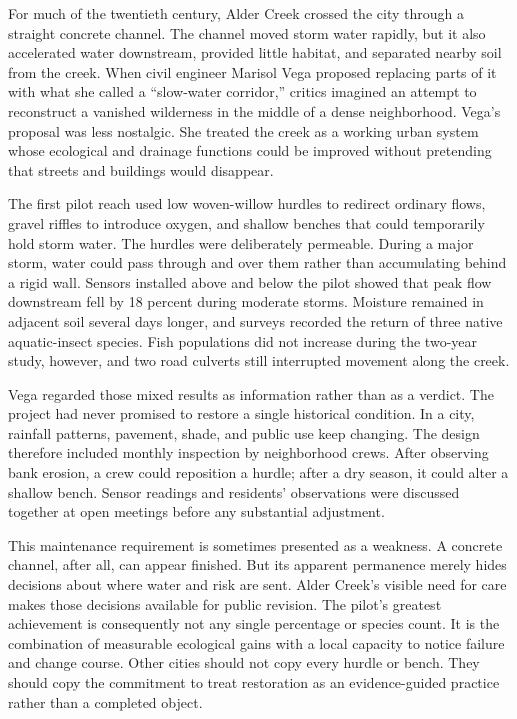 For much of the twentieth century, Alder Creek crossed the city through a straight
concrete channel. The channel moved storm water rapidly, but it also accelerated water
downstream, provided little habitat, and separated nearby soil from the creek. When civil
engineer Marisol Vega proposed replacing parts of it with what she called a ``slow-water
corridor,'' critics imagined an attempt to reconstruct a vanished wilderness in the middle
of a dense neighborhood. Vega's proposal was less nostalgic. She treated the creek as a
working urban system whose ecological and drainage functions could be improved without
pretending that streets and buildings would disappear.

The first pilot reach used low woven-willow hurdles to redirect ordinary flows, gravel
riffles to introduce oxygen, and shallow benches that could temporarily hold storm water.
The hurdles were deliberately permeable. During a major storm, water could pass through
and over them rather than accumulating behind a rigid wall. Sensors installed above and
below the pilot showed that peak flow downstream fell by 18 percent during moderate storms.
Moisture remained in adjacent soil several days longer, and surveys recorded the return of
three native aquatic-insect species. Fish populations did not increase during the two-year
study, however, and two road culverts still interrupted movement along the creek.

Vega regarded those mixed results as information rather than as a verdict. The project had
never promised to restore a single historical condition. In a city, rainfall patterns,
pavement, shade, and public use keep changing. The design therefore included monthly
inspection by neighborhood crews. After observing bank erosion, a crew could reposition a
hurdle; after a dry season, it could alter a shallow bench. Sensor readings and residents'
observations were discussed together at open meetings before any substantial adjustment.

This maintenance requirement is sometimes presented as a weakness. A concrete channel,
after all, can appear finished. But its apparent permanence merely hides decisions about
where water and risk are sent. Alder Creek's visible need for care makes those decisions
available for public revision. The pilot's greatest achievement is consequently not any
single percentage or species count. It is the combination of measurable ecological gains
with a local capacity to notice failure and change course. Other cities should not copy
every hurdle or bench. They should copy the commitment to treat restoration as an
evidence-guided practice rather than a completed object.

